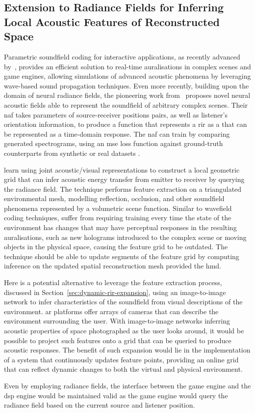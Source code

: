 \subsection{Extension to Radiance Fields for Inferring Local Acoustic Features of Reconstructed Space}
Parametric soundfield coding for interactive applications, as recently advanced by~\cite{raghuvanshi2018parametric}, provides an efficient solution to real-time auralisations in complex scenes and game engines, allowing simulations of advanced acoustic phenomena by leveraging wave-based sound propagation techniques.
Even more recently, building upon the domain of neural radiance fields, the pioneering work from~\cite{luo2022learning} proposes novel neural acoustic fields able to represent the soundfield of arbitrary complex scenes. Their \acrshort{naf} takes parameters of source-receiver positions pairs, as well as listener's orientation information, to produce a function that represents a \acrshort{rir} as a  that can be represented as a time-domain response. The \acrshort{naf} can train by comparing generated spectrograms, using an \acrshort{mse} loss function against ground-truth counterparts from synthetic or real datasets \citep{chen2022soundspaces}.\par
{} learn using joint acoustic/visual representations to construct a local geometric grid that can infer acoustic energy transfer from emitter to receiver by querying the radiance field. The technique performs feature extraction on a triangulated environmental mesh, modelling reflection, occlusion, and other soundfield phenomena represented by a volumetric scene function. Similar to wavefield coding techniques,  suffer from requiring training every time the state of the environment has changes that may have perceptual responses in the resulting auralisations, such as new holograms introduced to the complex scene or moving objects in the physical space, causing the feature grid to be outdated. The technique should be able to update segments of the feature grid by computing inference on the updated spatial reconstruction mesh provided the \acrshort{hmd}.\par
Here is a potential alternative to leverage the feature extraction process, discussed in Section~\ref{sec:dynamic-rir-expansion}, using an image-to-image network to infer characteristics of the soundfield from visual descriptions of the environment. \acrshort{ar} platforms offer arrays of cameras that can describe the environment surrounding the user. With image-to-image networks inferring acoustic properties of space photographed as the user looks around, it would be possible to project such features onto a grid that can be queried to produce acoustic responses. The benefit of such expansion would lie in the implementation of a system that continuously updates feature points, providing an online grid that can reflect dynamic changes to both the virtual and physical environment.\par
Even by employing radiance fields, the interface between the game engine and the \acrshort{dsp} engine would be maintained valid as the game engine would query the radiance field based on the current source and listener position.

